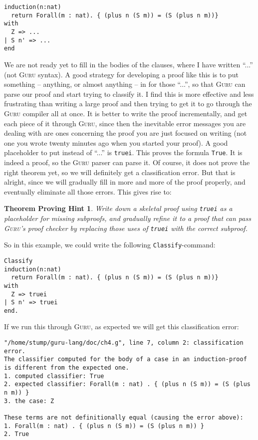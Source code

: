 \documentclass{book}[12pt]
\newcommand{\guru}[0]{\textsc{Guru}\xspace}
\newtheorem{hint}{Theorem Proving Hint}
\begin{document}
\begin{verbatim}
induction(n:nat) 
  return Forall(m : nat). { (plus n (S m)) = (S (plus n m))}
with
  Z => ...
| S n' => ...
end
\end{verbatim}

\noindent We are not ready yet to fill in the bodies of the clauses,
where I have written ``...'' (not \guru syntax).  A good strategy for
developing a proof like this is to put something -- anything, or
almost anything -- in for those ``...'', so that \guru can parse our
proof and start trying to classify it.  I find this is more effective
and less frustrating than writing a large proof and then trying to get
it to go through the \guru compiler all at once.  It is better to
write the proof incrementally, and get each piece of it through \guru,
since then the inevitable error messages you are dealing with are ones
concerning the proof you are just focused on writing (not one you
wrote twenty minutes ago when you started your proof).  A good
placeholder to put instead of ``...'' is \texttt{truei}.  This proves
the formula \texttt{True}.  It is indeed a proof, so the \guru parser
can parse it.  Of course, it does not prove the right theorem yet, so
we will definitely get a classification error.  But that is alright,
since we will gradually fill in more and more of the proof properly,
and eventually eliminate all those errors.  This gives rise to:

\begin{hint}
\label{hint:truei}
Write down a skeletal proof using \texttt{truei} as a placeholder
for missing subproofs, and gradually refine it to a proof that
can pass \guru's proof checker by replacing those uses of
\texttt{truei} with the correct subproof.
\end{hint}

\noindent So in this example, we could write the following
\texttt{Classify}-command:

\begin{verbatim}
Classify
induction(n:nat) 
  return Forall(m : nat). { (plus n (S m)) = (S (plus n m))}
with
  Z => truei
| S n' => truei
end.
\end{verbatim}

\noindent If we run this through \guru, as expected we will get this
classification error:

\begin{verbatim}
"/home/stump/guru-lang/doc/ch4.g", line 7, column 2: classification error.
The classifier computed for the body of a case in an induction-proof
is different from the expected one.
1. computed classifier: True
2. expected classifier: Forall(m : nat) . { (plus n (S m)) = (S (plus n m)) }
3. the case: Z

These terms are not definitionally equal (causing the error above):
1. Forall(m : nat) . { (plus n (S m)) = (S (plus n m)) }
2. True
\end{verbatim}
\end{document}
